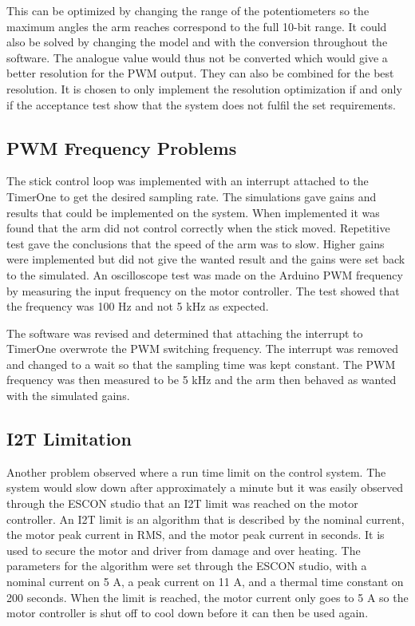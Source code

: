 This can be optimized by changing the range of the potentiometers so the maximum angles the arm reaches correspond to the full 10-bit range. It could also be solved by changing the model and with the conversion throughout the software. The analogue value would thus not be converted which would give a better resolution for the PWM output. They can also be combined for the best resolution. It is chosen to only implement the resolution optimization if and only if the acceptance test show that the system does not fulfil the set requirements.

\subsection{PWM Frequency Problems}
The stick control loop was implemented with an interrupt attached to the TimerOne to get the desired sampling rate. The simulations gave gains and results that could be implemented on the system. When implemented it was found that the arm did not control correctly when the stick moved. Repetitive test gave the conclusions that the speed of the arm was to slow. Higher gains were implemented but did not give the wanted result and the gains were set back to the simulated. An oscilloscope test was made on the Arduino PWM frequency by measuring the input frequency on the motor controller. The test showed that the frequency was 100 Hz and not 5 kHz as expected. 

The software was revised and determined that attaching the interrupt to TimerOne overwrote the PWM switching frequency. The interrupt was removed and changed to a wait so that the sampling time was kept constant. The PWM frequency was then measured to be 5 kHz and the arm then behaved as wanted with the simulated gains. 

\subsection{I2T Limitation}
Another problem observed where a run time limit on the control system. The system would slow down after approximately a minute but it was easily observed through the ESCON studio that an I2T limit was reached on the motor controller. An I2T limit is an algorithm that is described by the nominal current, the motor peak current in RMS, and the motor peak current in seconds. It is used to secure the motor and driver from damage and over heating. The parameters for the algorithm were set through the ESCON studio, with a nominal current on 5 A, a peak current on 11 A, and a thermal time constant on 200 seconds. When the limit is reached, the motor current only goes to 5 A so the motor controller is shut off to cool down before it can then be used again.  

